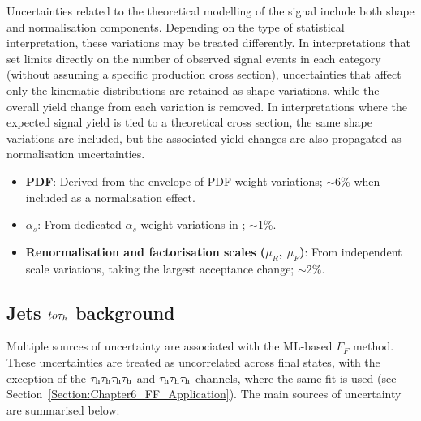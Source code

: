 Uncertainties related to the theoretical modelling of the signal include both shape and normalisation components. Depending on the type of statistical interpretation, these variations may be treated differently. In interpretations that set limits directly on the number of observed signal events in each category (without assuming a specific production cross section), uncertainties that affect only the kinematic distributions are retained as shape variations, while the overall yield change from each variation is removed. In interpretations where the expected signal yield is tied to a theoretical cross section, the same shape variations are included, but the associated yield changes are also propagated as normalisation uncertainties.

\begin{itemize}
\item \textbf{\ac{PDF}}: Derived from the envelope of \ac{PDF} weight variations; $\sim$6\% when included as a normalisation effect.
\item \boldmath$\alpha_s$\unboldmath: From dedicated $\alpha_s$ weight variations in \MCATNLO; $\sim$1\%.
\item \textbf{Renormalisation and factorisation scales ($\mu_R$, $\mu_F$)}: From independent scale variations, taking the largest acceptance change; $\sim$2\%.
\end{itemize}

\subsection{Jets \texorpdfstring{$to \tau_h$}{to hadronic tau} background}

Multiple sources of uncertainty are associated with the \ac{ML}-based $F_F$ method. These uncertainties are treated as uncorrelated across final states, with the exception of the $\tau_\mathrm{h}\tau_\mathrm{h}\tau_\mathrm{h}\tau_\mathrm{h}$ and $\tau_\mathrm{h}\tau_\mathrm{h}\tau_\mathrm{h}$ channels, where the same fit is used (see Section~\ref{Section:Chapter6_FF_Application}). The main sources of uncertainty are summarised below:

